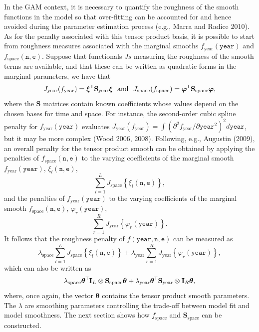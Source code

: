 \documentclass[10pt]{article}
\newcommand{\ts}{^{\sf T}}
\theoremstyle{definition}
\theoremstyle{plain}
\begin{document}
In the GAM context, it is necessary to quantify the roughness of the smooth functions in the model so that over-fitting can be accounted for and hence avoided during the parameter estimation process (e.g., Marra and Radice 2010). As for the penalty associated with this tensor product basis, it is possible to start from roughness measures associated with the marginal smooths $f_\text{year}(\texttt{year})$ and $f_\text{space}(\texttt{n},\texttt{e})$. Suppose that functionals $Js$ measuring the roughness of the smooth terms are available, and that these can be written as quadratic forms in the marginal parameters, we have that
$$
J_\text{year}(f_\text{year})=\bm\xi\ts\textbf{S}_\text{year}\bm\xi \ \ \text{and} \ \ J_\text{space}(f_\text{space})=\bm\varphi\ts\textbf{S}_\text{space}\bm\varphi,
$$
where the $\textbf{S}$ matrices contain known coefficients whose values depend on the chosen bases for time and space. For instance, the second-order cubic spline penalty for $f_\text{year}(\texttt{year})$ evaluates $J_\text{year}(f_\text{year})=\int\left( \partial^2 f_\text{year}/\partial \texttt{year}^2 \right)^2 d\texttt{year}$, but it may be more complex (Wood 2006, 2008). Following, e.g., Augustin (2009), an overall penalty for the tensor product smooth can be obtained by applying the penalties of $f_\text{space}(\texttt{n},\texttt{e})$ to the varying coefficients of the marginal smooth $f_\text{year}(\texttt{year})$, $\xi_l(\texttt{n},\texttt{e})$,
$$
\sum_{l=1}^L J_\text{space}\left\{  \xi_l(\texttt{n},\texttt{e}) \right\},
$$ 
and the penalties of $f_\text{year}(\texttt{year})$ to the varying coefficients of the marginal smooth $f_\text{space}(\texttt{n},\texttt{e})$, $\varphi_r(\texttt{year})$,  
$$
\sum_{r=1}^R J_\text{year}\left\{  \varphi_r(\texttt{year}) \right\}.
$$ 
It follows that the roughness penalty of $f(\texttt{year},\texttt{n},\texttt{e})$ can be measured as 
$$
\lambda_\text{space} \sum_{l=1}^L J_\text{space}\left\{  \xi_l(\texttt{n},\texttt{e}) \right\} + \lambda_\text{year} \sum_{r=1}^R J_\text{year}\left\{  \varphi_r(\texttt{year}) \right\},
$$
which can also be written as
$$
\lambda_\text{space} \bm\theta\ts \textbf{I}_L \otimes \textbf{S}_\text{space} \bm\theta + \lambda_\text{year} \bm\theta\ts \textbf{S}_\text{year} \otimes \textbf{I}_R  \bm\theta,
$$
where, once again, the vector $\bm\theta$ contains the tensor product smooth parameters. The $\lambda$ are smoothing parameters controlling the trade-off between model fit and model smoothness. The next section shows how $f_\text{space}$ and $\textbf{S}_\text{space}$ can be constructed.   
\end{document}
